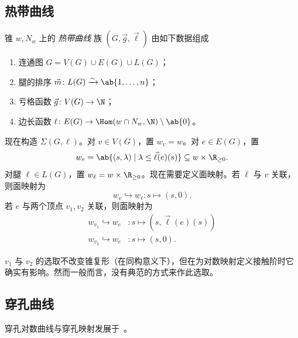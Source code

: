 \subsection{热带曲线}%
\label{sub:Tropical curves}

\begin{defn}
    锥 \(w, N_w\) 上的 \textit{热带曲线} 族 \((G, \vec{g}, \vec{\ell})\) 由如下数据组成
    \begin{enumerate}
        \item 连通图 \(G = V(G) \cup E(G) \cup L(G)\)；
        \item 腿的排序 \(\vec{m} \colon L(G) \xrightarrow{\sim} \ab\{1, \ldots, n\}\)；
        \item 亏格函数 \(\vec{g} \colon V(G) \to \N\)；
        \item 边长函数 \(\ell \colon E(G) \to \Hom(w \cap N_w, \N) \setminus \ab\{0\}\)。
    \end{enumerate}
\end{defn}

现在构造 \(\Sigma(G, \ell)\)。对 \(v \in V(G)\)，置 \(w_v = w\)。对 \(e \in E(G)\)，置
\[ w_e = \ab\{ (s, \lambda) \mid \lambda \leq \vec{\ell}(e)(s) \} \subseteq w \times \R_{\geq 0}. \]
对腿 \(\ell \in L(G)\)，置 \(w_{\ell} = w \times \R_{\geq 0}\)。现在需要定义面映射。若 \(\ell\) 与 \(v\) 关联，则面映射为
\[ w_v \hookrightarrow w_{\ell} \colon s \mapsto (s, 0). \]
若 \(e\) 与两个顶点 \(v_1, v_2\) 关联，则面映射为
\begin{align*}
    w_{v_1} \hookrightarrow w_e &\colon s \mapsto (s, \vec{\ell}(e)(s)) \\
    w_{v_2} \hookrightarrow w_e & \colon s \mapsto (s, 0).
\end{align*}
\begin{rmk}
    \(v_1\) 与 \(v_2\) 的选取不改变锥复形（在同构意义下），但在为对数映射定义接触阶时它确实有影响。然而一般而言，没有典范的方式来作此选取。
\end{rmk}

\subsection{穿孔曲线}%
\label{sub:Punctured curves}

穿孔对数曲线与穿孔映射发展于~\cite{ACGS2025}。

